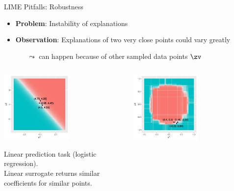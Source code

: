 \documentclass[11pt,compress,t,notes=noshow, aspectratio=169, xcolor=table]{beamer}
\begin{document}
\begin{vbframe}[c]{LIME Pitfalls: Robustness }
\begin{itemize}
	\item \textbf{Problem}: Instability of explanations 
	\item \textbf{Observation}: Explanations of two very close points could vary greatly 
	\begin{itemize}
	    \item[$\leadsto$] can happen because of other sampled data points $\zv$
	\end{itemize}
\end{itemize}
\vspace{-0.7cm}
\begin{columns}
	\begin{column}{0.48\textwidth}
		\begin{center}
		
		\includegraphics[width=0.55\textwidth]{figure/lime_robustness_1.png}
		
		{Linear prediction task (logistic regression). \\Linear surrogate returns similar coefficients for similar points.}
		
		\end{center}
	\end{column}
	\begin{column}{0.48\textwidth}
		\begin{center}
	\includegraphics[width=0.55\textwidth]{figure/lime_robustness_2.png}
	

\end{center}
\end{column}
\end{columns}
\end{vbframe}
\end{document}
